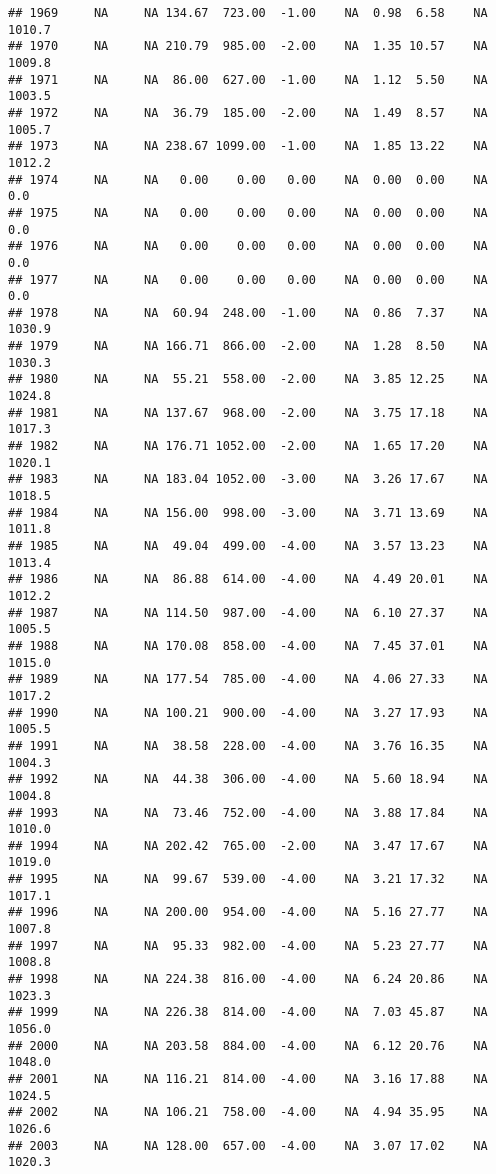 \documentclass{article}\usepackage{graphicx, color}
\makeatletter
\newenvironment{kframe}{%
 \def\at@end@of@kframe{}%
 \ifinner\ifhmode%
  \def\at@end@of@kframe{\end{minipage}}%
  \begin{minipage}{\columnwidth}%
 \fi\fi%
 \def\FrameCommand##1{\hskip\@totalleftmargin \hskip-\fboxsep
 \colorbox{shadecolor}{##1}\hskip-\fboxsep
     \hskip-\linewidth \hskip-\@totalleftmargin \hskip\columnwidth}%
 \MakeFramed {\advance\hsize-\width
   \@totalleftmargin\z@ \linewidth\hsize
   \@setminipage}}%
 {\par\unskip\endMakeFramed%
 \at@end@of@kframe}
\newenvironment{knitrout}{}{} %
\makeatother
\begin{document}
\begin{knitrout}
\begin{kframe}
\begin{verbatim}
## 1969     NA     NA 134.67  723.00  -1.00    NA  0.98  6.58    NA 1010.7
## 1970     NA     NA 210.79  985.00  -2.00    NA  1.35 10.57    NA 1009.8
## 1971     NA     NA  86.00  627.00  -1.00    NA  1.12  5.50    NA 1003.5
## 1972     NA     NA  36.79  185.00  -2.00    NA  1.49  8.57    NA 1005.7
## 1973     NA     NA 238.67 1099.00  -1.00    NA  1.85 13.22    NA 1012.2
## 1974     NA     NA   0.00    0.00   0.00    NA  0.00  0.00    NA    0.0
## 1975     NA     NA   0.00    0.00   0.00    NA  0.00  0.00    NA    0.0
## 1976     NA     NA   0.00    0.00   0.00    NA  0.00  0.00    NA    0.0
## 1977     NA     NA   0.00    0.00   0.00    NA  0.00  0.00    NA    0.0
## 1978     NA     NA  60.94  248.00  -1.00    NA  0.86  7.37    NA 1030.9
## 1979     NA     NA 166.71  866.00  -2.00    NA  1.28  8.50    NA 1030.3
## 1980     NA     NA  55.21  558.00  -2.00    NA  3.85 12.25    NA 1024.8
## 1981     NA     NA 137.67  968.00  -2.00    NA  3.75 17.18    NA 1017.3
## 1982     NA     NA 176.71 1052.00  -2.00    NA  1.65 17.20    NA 1020.1
## 1983     NA     NA 183.04 1052.00  -3.00    NA  3.26 17.67    NA 1018.5
## 1984     NA     NA 156.00  998.00  -3.00    NA  3.71 13.69    NA 1011.8
## 1985     NA     NA  49.04  499.00  -4.00    NA  3.57 13.23    NA 1013.4
## 1986     NA     NA  86.88  614.00  -4.00    NA  4.49 20.01    NA 1012.2
## 1987     NA     NA 114.50  987.00  -4.00    NA  6.10 27.37    NA 1005.5
## 1988     NA     NA 170.08  858.00  -4.00    NA  7.45 37.01    NA 1015.0
## 1989     NA     NA 177.54  785.00  -4.00    NA  4.06 27.33    NA 1017.2
## 1990     NA     NA 100.21  900.00  -4.00    NA  3.27 17.93    NA 1005.5
## 1991     NA     NA  38.58  228.00  -4.00    NA  3.76 16.35    NA 1004.3
## 1992     NA     NA  44.38  306.00  -4.00    NA  5.60 18.94    NA 1004.8
## 1993     NA     NA  73.46  752.00  -4.00    NA  3.88 17.84    NA 1010.0
## 1994     NA     NA 202.42  765.00  -2.00    NA  3.47 17.67    NA 1019.0
## 1995     NA     NA  99.67  539.00  -4.00    NA  3.21 17.32    NA 1017.1
## 1996     NA     NA 200.00  954.00  -4.00    NA  5.16 27.77    NA 1007.8
## 1997     NA     NA  95.33  982.00  -4.00    NA  5.23 27.77    NA 1008.8
## 1998     NA     NA 224.38  816.00  -4.00    NA  6.24 20.86    NA 1023.3
## 1999     NA     NA 226.38  814.00  -4.00    NA  7.03 45.87    NA 1056.0
## 2000     NA     NA 203.58  884.00  -4.00    NA  6.12 20.76    NA 1048.0
## 2001     NA     NA 116.21  814.00  -4.00    NA  3.16 17.88    NA 1024.5
## 2002     NA     NA 106.21  758.00  -4.00    NA  4.94 35.95    NA 1026.6
## 2003     NA     NA 128.00  657.00  -4.00    NA  3.07 17.02    NA 1020.3

\end{verbatim}
\end{kframe}
\end{knitrout}
\end{document}
